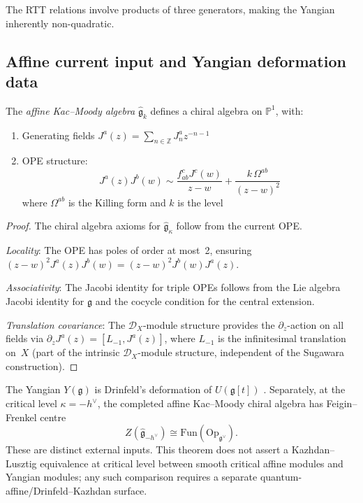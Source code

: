The RTT relations involve products of three generators, making the Yangian inherently non-quadratic.

\subsection{Affine current input and Yangian deformation data}

\begin{theorem}
\label{thm:chiral-yangian-km}
The \emph{affine Kac--Moody algebra} $\hat{\mathfrak{g}}_k$ defines a chiral algebra on $\mathbb{P}^1$, with:
\begin{enumerate}
\item Generating fields $J^a(z) = \sum_{n \in \mathbb{Z}} J_n^a z^{-n-1}$
\item OPE structure:
\[
J^a(z)J^b(w) \sim \frac{f_{ab}^c J^c(w)}{z-w} + \frac{k\, \Omega^{ab}}{(z-w)^2}
\]
where $\Omega^{ab}$ is the Killing form and $k$ is the level
\end{enumerate}
\end{theorem}

\begin{proof}
The chiral algebra axioms for $\hat{\mathfrak{g}}_\kappa$ follow from
the current OPE.

\emph{Locality}: The OPE has poles of order at most~2, ensuring $(z-w)^2 J^a(z)J^b(w) = (z-w)^2 J^b(w)J^a(z)$.

\emph{Associativity}: The Jacobi identity for triple OPEs follows from the Lie algebra Jacobi identity for $\mathfrak{g}$ and the cocycle condition for the central extension.

\emph{Translation covariance}: The $\mathcal{D}_X$-module structure provides the $\partial_z$-action on all fields via $\partial_z J^a(z) = [L_{-1}, J^a(z)]$, where $L_{-1}$ is the infinitesimal translation on~$X$ (part of the intrinsic $\mathcal{D}_X$-module structure, independent of the Sugawara construction). \qedhere
\end{proof}

\begin{theorem}
\label{thm:chiral-yangian}
The Yangian $Y(\mathfrak{g})$ is Drinfeld's deformation of
$U(\mathfrak{g}[t])$ \cite{Drinfeld85}.  Separately, at the critical
level $\kappa=-h^\vee$, the completed affine Kac--Moody chiral
algebra has Feigin--Frenkel centre
\[
Z(\hat{\mathfrak{g}}_{-h^\vee})
 \cong \mathrm{Fun}(\mathrm{Op}_{\mathfrak{g}^\vee}).
\]
These are distinct external inputs.  This theorem does not assert a
Kazhdan--Lusztig equivalence at critical level between smooth
critical affine modules and Yangian modules; any such comparison
requires a separate quantum-affine/Drinfeld--Kazhdan surface.
\end{theorem}

